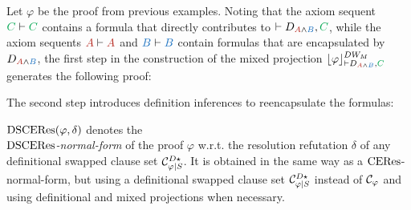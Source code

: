 \begin{example}
\label{example:DWProjectionMixed}
Let $\varphi$ be the proof from previous examples. Noting that the axiom sequent $\hE{C} \seq \hE{C}$ contains a formula that directly contributes to $\seq D_{\hA{A} \structplus \hB{B}} , \hE{C}$, while the axiom sequents $\hA{A} \seq \hA{A}$ and $\hB{B} \seq \hB{B}$ contain formulas that are encapsulated by $D_{\hA{A} \structplus \hB{B}}$, the first step in the construction of the mixed 
projection $\projectionDWMixed{\varphi}{\seq D_{\hA{A} \structplus \hB{B}} , \hE{C}}$generates the following proof:
%
\begin{prooftree}
		 
	 
								 
\end{prooftree}
%

\noindent
The second step introduces definition inferences to reencapsulate the formulas:
\begin{prooftree}
		 
	 
	 
							 
\end{prooftree}
\hfill\QED
\end{example}

\begin{definition}
$\CEResNFDS{\varphi}{\delta}$ denotes the \\ \emph{$\CEResDS$-normal-form} of the proof $\varphi$ w.r.t. the resolution refutation $\delta$ of any definitional swapped clause set $\clausesetSwapDef{\varphi}{S}$. It is obtained in the same way as a $\CERes$-normal-form, but using a definitional swapped clause set $\clausesetSwapDef{\varphi}{S}$ instead of $\clauseset{\varphi}$ and using definitional and mixed projections when necessary.
\end{definition}

